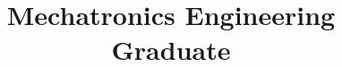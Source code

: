 \documentclass[11pt,a4paper,sans]{moderncv}
\title{Mechatronics Engineering Graduate}
\begin{document}
\makecvtitle











\end{document}
